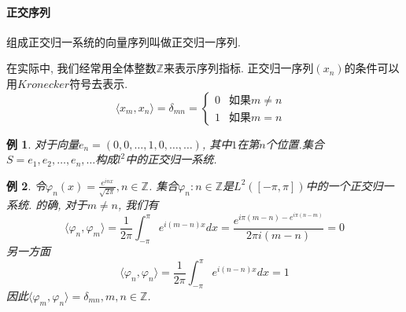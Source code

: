 \documentclass[a4paper,11pt]{article}
\theoremstyle{mystyle}
\newtheorem{example}{\hspace{2em}例}[section]
\begin{document}
\paragraph*{正交序列}
\begin{definition}
  组成正交归一系统的向量序列叫做正交归一序列.
\end{definition}
在实际中, 我们经常用全体整数$\mathbb{Z}$来表示序列指标. 正交归一序列$(x_n)$的条件可以用$Kronecker$符号去表示.
\begin{equation*}
  \langle x_m,x_n\rangle=\delta_{mn}=\begin{cases}
                                       0 & \text{如果$m\neq n$ }\\
                                       1 & \text{如果$m=n$}
                                     \end{cases}
\end{equation*}
\begin{example}
  对于向量$e_n=(0,0,\dots,1,0,\dots,\dots)$, 其中$1$在第$n$个位置.集合$S={e_1,e_2,\dots,e_n,\dots}$构成$l^2$中的正交归一系统.
\end{example}
\begin{example}
  令$\varphi_n(x)=\frac{e^{inx}}{\sqrt{2\pi}},n\in \mathbb{Z}$. 集合${\varphi_n:n\in\mathbb{Z}}$是$L^2([-\pi,\pi])$中的一个正交归一系统. 的确, 对于$m\neq n$, 我们有
  \begin{equation*}
    \langle\varphi_n,\varphi_m\rangle=\frac{1}{2\pi}\int_{-\pi}^{\pi}e^{i(m-n)x}dx=\frac{e^{i\pi(m-n)-e^{i\pi(n-m)}}}{2\pi i(m-n)}=0
  \end{equation*}
  另一方面
  \begin{equation*}
    \langle\varphi_n,\varphi_n\rangle=\frac{1}{2\pi}\int_{-\pi}^{\pi}e^{i(n-n)x}dx=1
  \end{equation*}
  因此$\langle\varphi_m,\varphi_n\rangle=\delta_{mn},m,n\in\mathbb{Z}$.
\end{example}
\end{document}
